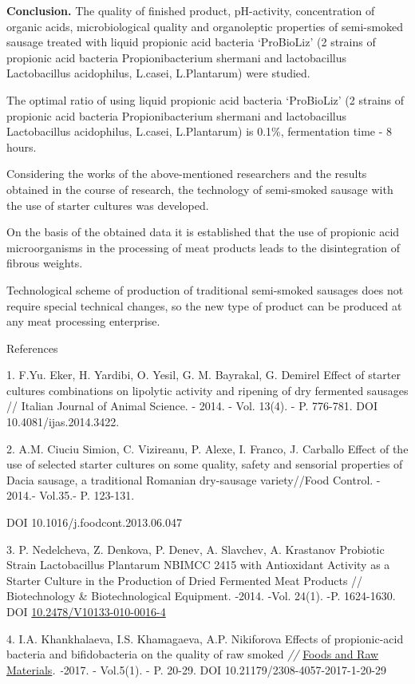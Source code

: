 {\bfseries Conclusion.} The quality of finished product, pH-activity,
concentration of organic acids, microbiological quality and organoleptic
properties of semi-smoked sausage treated with liquid propionic acid
bacteria `ProBioLiz' (2 strains of propionic acid bacteria
Propionibacterium shermani and lactobacillus Lactobacillus acidophilus,
L.casei, L.Plantarum) were studied.

The optimal ratio of using liquid propionic acid bacteria `ProBioLiz' (2
strains of propionic acid bacteria Propionibacterium shermani and
lactobacillus Lactobacillus acidophilus, L.casei, L.Plantarum) is 0.1\%,
fermentation time - 8 hours.

Considering the works of the above-mentioned researchers and the results
obtained in the course of research, the technology of semi-smoked
sausage with the use of starter cultures was developed.

On the basis of the obtained data it is established that the use of
propionic acid microorganisms in the processing of meat products leads
to the disintegration of fibrous weights.

Technological scheme of production of traditional semi-smoked sausages
does not require special technical changes, so the new type of product
can be produced at any meat processing enterprise.

References

1. F.Yu. Eker, H. Yardibi, O. Yesil, G. M. Bayrakal, G. Demirel Effect
of starter cultures combinations on lipolytic activity and ripening of
dry fermented sausages // Italian Journal of Animal Science. - 2014. -
Vol. 13(4). - P. 776-781. DOI 10.4081/ijas.2014.3422.

2. A.M. Ciuciu Simion, C. Vizireanu, P. Alexe, I. Franco, J. Carballo
Effect of the use of selected starter cultures on some quality, safety
and sensorial properties of Dacia sausage, a traditional Romanian
dry-sausage variety//Food Control. - 2014.- Vol.35.- P. 123-131.

DOI 10.1016/j.foodcont.2013.06.047

3. P. Nedelcheva, Z. Denkova, P. Denev, A. Slavchev, A. Krastanov
Probiotic Strain Lactobacillus Plantarum NBIMCC 2415 with Antioxidant
Activity as a Starter Culture in the Production of Dried Fermented Meat
Products // Biotechnology \& Biotechnological Equipment. -2014. -Vol.
24(1). -P. 1624-1630. DOI
\href{https://doi.org/10.2478/V10133-010-0016-4}{10.2478/V10133-010-0016-4}

4. I.A. Khankhalaeva, I.S. Khamagaeva, A.P. Nikiforova Effects of
propionic-acid bacteria and bifidobacteria on the quality of raw smoked
\emph{//}
\href{https://library.kazatu.kz:2057/sourceid/21100777291}{Foods and Raw
Materials}\emph{. -}2017. - Vol.5(1). - P. 20-29. DOI
10.21179/2308-4057-2017-1-20-29

